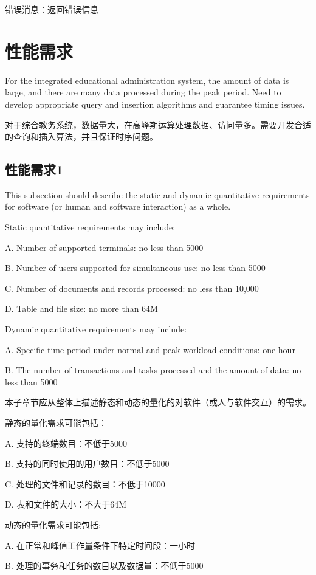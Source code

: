 	错误消息：返回错误信息

\section{性能需求}

For the integrated educational administration system, the amount of data is large, and there are many data processed during the peak period. Need to develop appropriate query and insertion algorithms and guarantee timing issues.

对于综合教务系统，数据量大，在高峰期运算处理数据、访问量多。需要开发合适的查询和插入算法，并且保证时序问题。

\subsection{性能需求1}
This subsection should describe the static and dynamic quantitative requirements for software (or human and software interaction) as a whole.

Static quantitative requirements may include:

A. Number of supported terminals: no less than 5000

B. Number of users supported for simultaneous use: no less than 5000

C. Number of documents and records processed: no less than 10,000

D. Table and file size: no more than 64M

Dynamic quantitative requirements may include:

A. Specific time period under normal and peak workload conditions: one hour

B. The number of transactions and tasks processed and the amount of data: no less than 5000

本子章节应从整体上描述静态和动态的量化的对软件（或人与软件交互）的需求。

静态的量化需求可能包括：

A. 支持的终端数目：不低于5000

B. 支持的同时使用的用户数目：不低于5000

C. 处理的文件和记录的数目：不低于10000

D. 表和文件的大小：不大于64M

动态的量化需求可能包括:

A. 在正常和峰值工作量条件下特定时间段：一小时

B. 处理的事务和任务的数目以及数据量：不低于5000

